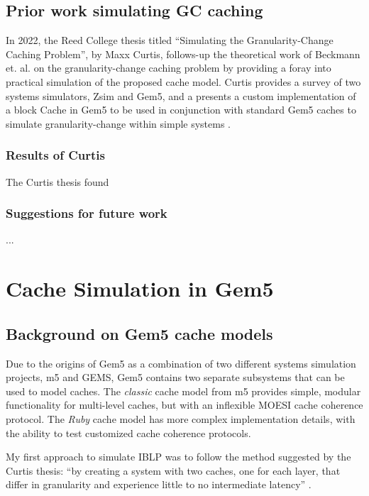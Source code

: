 \documentclass[12pt,twoside]{reedthesis}
\begin{document}
\section{Prior work simulating GC caching}
In 2022, the Reed College thesis titled ``Simulating the Granularity-Change Caching Problem'', by Maxx Curtis, follows-up the theoretical work of Beckmann et. al. on the granularity-change caching problem by providing a foray into practical simulation of the proposed cache model. Curtis provides a survey of two systems simulators, Zsim and Gem5, and a presents a custom implementation of a block Cache in Gem5 to be used in conjunction with standard Gem5 caches to simulate granularity-change within simple systems \cite{curtis}.

	\subsection*{Results of Curtis}

	The Curtis thesis found 

	\subsection*{Suggestions for future work}

	...

\chapter{Cache Simulation in Gem5}

\section{Background on Gem5 cache models}

	Due to the origins of Gem5 as a combination of two different systems simulation projects, m5 and GEMS, Gem5 contains two separate subsystems that can be used to model caches. The \textit{classic} cache model from m5 provides simple, modular functionality for multi-level caches, but with an inflexible MOESI cache coherence protocol. The \textit{Ruby} cache model has more complex implementation details, with the ability to test customized cache coherence protocols.

	My first approach to simulate IBLP was to follow the method suggested by the Curtis thesis: ``by creating a system with two caches, one for each layer, that differ in granularity and experience little to no intermediate latency'' \cite{curtis}.
\end{document}
